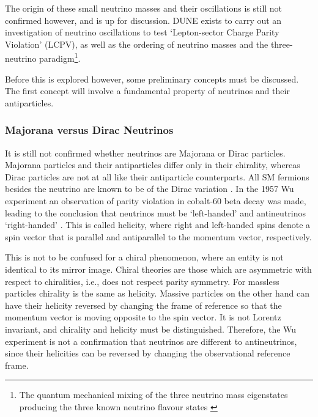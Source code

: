 \documentclass[10pt]{article}
\begin{document}
The origin of these small neutrino masses and their oscillations is still not confirmed however, and is up for discussion. DUNE exists to carry out an investigation of neutrino oscillations to test `Lepton-sector Charge Parity Violation' (LCPV), as well as the ordering of neutrino masses and the three-neutrino paradigm\footnote{The quantum mechanical mixing of the three neutrino mass eigenstates producing the three known neutrino flavour states \cite{acciarri2016longbaseline}}. 

Before this is explored however, some preliminary concepts must be discussed. The first concept will involve a fundamental property of neutrinos and their antiparticles.

\subsubsection{Majorana versus Dirac Neutrinos} \label{majorana_dirac}

It is still not confirmed whether neutrinos are Majorana or Dirac particles. Majorana particles and their antiparticles differ only in their chirality, whereas Dirac particles are not at all like their antiparticle counterparts. All SM fermions besides the neutrino are known to be of the Dirac variation \cite{bilenky2020neutrinos}. In the 1957 Wu experiment an observation of parity violation in cobalt-60 beta decay was made, leading to the conclusion that neutrinos must be `left-handed' and antineutrinos `right-handed' \cite{wu1957experimental}. This is called helicity, where right and left-handed spins denote a spin vector that is parallel and antiparallel to the momentum vector, respectively.

This is not to be confused for a chiral phenomenon, where an entity is not identical to its mirror image. Chiral theories are those which are asymmetric with respect to chiralities, i.e., does not respect parity symmetry. For massless particles chirality is the same as helicity. Massive particles on the other hand can have their helicity reversed by changing the frame of reference so that the momentum vector is moving opposite to the spin vector. It is not Lorentz invariant, and chirality and helicity must be distinguished. Therefore, the Wu experiment is not a confirmation that neutrinos are different to antineutrinos, since their helicities can be reversed by changing the observational reference frame.
\end{document}
